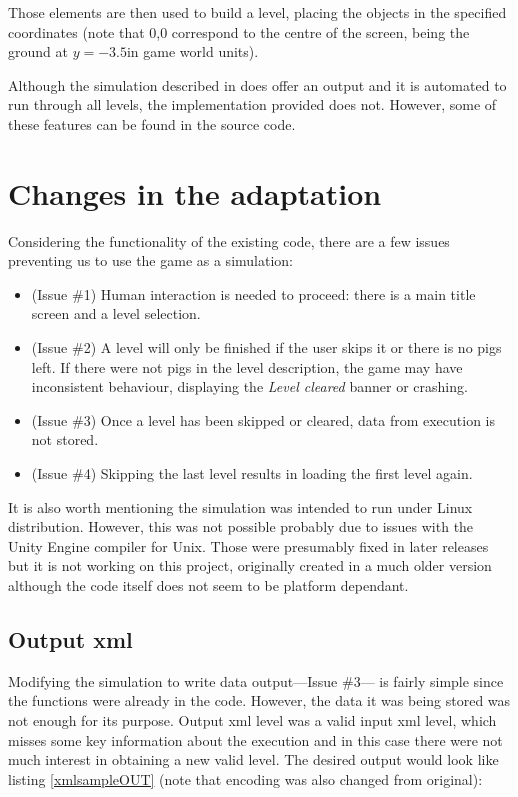 Those elements are then used to build a level, placing the objects in the specified coordinates (note that 0,0 correspond to the centre of the screen, being the ground at $y=-3.5$in game world units).

Although the simulation described in \cite{ferreira2014search} does offer an output and it is automated to run through all levels, the implementation provided does not. However, some of these features can be found in the source code.

\section{Changes in the adaptation}
Considering the functionality of the existing code, there are a few issues preventing us to use the game as a simulation:

\begin{itemize}
	\item (Issue \#1) Human interaction is needed to proceed: there is a main title screen and a level selection.
	\item (Issue \#2) A level will only be finished if the user skips it or there is no pigs left. If there were not pigs in the level description, the game may have inconsistent behaviour, displaying the \textit{Level cleared} banner or crashing.
	\item (Issue \#3) Once a level has been skipped or cleared, data from execution is not stored.
	\item (Issue \#4) Skipping the last level results in loading the first level again. 
\end{itemize}

It is also worth mentioning the simulation was intended to run under Linux distribution. However, this was not possible probably due to issues with the Unity Engine compiler for Unix. Those were presumably fixed in later releases but it is not working on this project, originally created in a much older version although the code itself does not seem to be platform dependant.


\subsection{Output xml}

Modifying the simulation to write data output---Issue \#3--- is fairly simple since the functions were already in the code. However, the data it was being stored was not enough for its purpose. Output xml level was a valid input xml level, which misses some key information about the execution and in this case there were not much interest in obtaining a new valid level. The desired output would look like listing \ref{xmlsampleOUT} (note that encoding was also changed from original):

